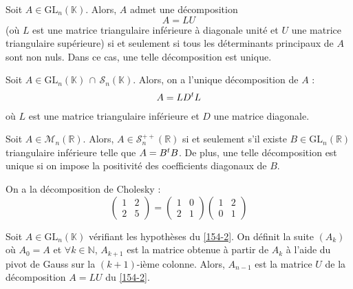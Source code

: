 	\begin{theorem}
		\label{154-2}
		Soit $A \in \mathrm{GL}_n(\mathbb{K})$. Alors, $A$ admet une décomposition
		\[ A = LU \]
		(où $L$ est une matrice triangulaire inférieure à diagonale unité et $U$ une matrice triangulaire supérieure) si et seulement si tous les déterminants principaux de $A$ sont non nuls. Dans ce cas, une telle décomposition est unique.
	\end{theorem}
	
	\begin{corollary}
		Soit $A \in \mathrm{GL}_n(\mathbb{K}) \, \cap \, \mathcal{S}_n(\mathbb{K})$. Alors, on a l'unique décomposition de $A$ :
		\[ A = LD\mathstrut ^t L \]
		où $L$ est une matrice triangulaire inférieure et $D$ une matrice diagonale.
	\end{corollary}
	
	\begin{application}
		Soit $A \in \mathcal{M}_n(\mathbb{R})$. Alors, $A \in \mathcal{S}_n^{++}(\mathbb{R})$ si et seulement s'il existe $B \in \mathrm{GL}_n(\mathbb{R})$ triangulaire inférieure telle que $A = B\mathstrut ^t B$. De plus, une telle décomposition est unique si on impose la positivité des coefficients diagonaux de $B$.
	\end{application}
	
	
	\begin{example}
		On a la décomposition de Cholesky :
		\[ \begin{pmatrix} 1 & 2 \\ 2 & 5 \end{pmatrix} = \begin{pmatrix} 1 & 0 \\ 2 & 1 \end{pmatrix} \begin{pmatrix} 1 & 2 \\ 0 & 1 \end{pmatrix} \]
	\end{example}
	
	
	\begin{proposition}
		Soit $A \in \mathrm{GL}_n(\mathbb{K})$ vérifiant les hypothèses du \cref{154-2}. On définit la suite $(A_k)$ où $A_0 = A$ et $\forall k \in \mathbb{N}$, $A_{k+1}$ est la matrice obtenue à partir de $A_k$ à l'aide du pivot de Gauss sur la $(k+1)$-ième colonne. Alors, $A_{n-1}$ est la matrice $U$ de la décomposition $A = LU$ du \cref{154-2}.
	\end{proposition}
	
